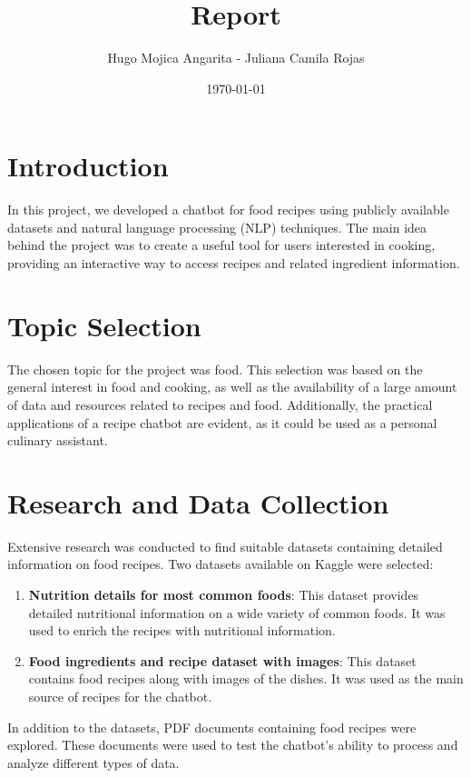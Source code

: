 \documentclass{article}
\title{Report}
\author{Hugo Mojica Angarita - Juliana Camila Rojas}
\date{\today}
\begin{document}
\maketitle

\section{Introduction}

In this project, we developed a chatbot for food recipes using publicly available datasets and natural language processing (NLP) techniques. The main idea behind the project was to create a useful tool for users interested in cooking, providing an interactive way to access recipes and related ingredient information.

\section{Topic Selection}

The chosen topic for the project was food. This selection was based on the general interest in food and cooking, as well as the availability of a large amount of data and resources related to recipes and food. Additionally, the practical applications of a recipe chatbot are evident, as it could be used as a personal culinary assistant.

\section{Research and Data Collection}

Extensive research was conducted to find suitable datasets containing detailed information on food recipes. Two datasets available on Kaggle were selected:

\begin{enumerate}
    \item \textbf{Nutrition details for most common foods}: This dataset provides detailed nutritional information on a wide variety of common foods. It was used to enrich the recipes with nutritional information.
    \item \textbf{Food ingredients and recipe dataset with images}: This dataset contains food recipes along with images of the dishes. It was used as the main source of recipes for the chatbot.
\end{enumerate}

In addition to the datasets, PDF documents containing food recipes were explored. These documents were used to test the chatbot's ability to process and analyze different types of data.
\end{document}
